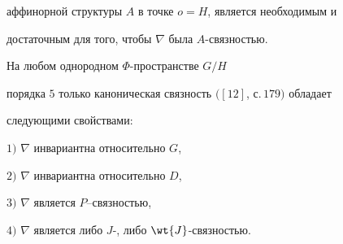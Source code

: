 аффинорной структуры $A$ в точке $o=H$, является необходимым и


достаточным для того, чтобы $\nabla$ была $A$-связностью.





\begin{thm}


На любом однородном $\Phi$-пространстве $G/H$


порядка $5$ только каноническая связность $([12]$, с.\,$179)$ обладает


следующими свойствами\/$:$





$1)$ $\nabla$ инвариантна относительно $G$,





$2)$ $\nabla$ инвариантна относительно $D$,





$3)$ $\nabla$ является $P$--связностью,





$4)$ $\nabla$ является либо $J$-, либо $ \wt{J}$-связностью.


\end{thm}





